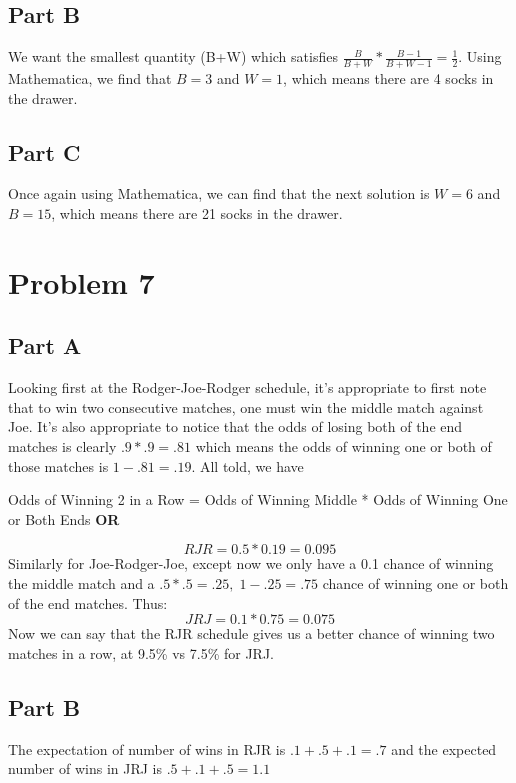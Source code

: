 \documentclass[11pt]{article}
\begin{document}
\subsection*{Part B}
We want the smallest quantity (B+W) which satisfies $\frac{B}{B+W} * \frac{B-1}{B+W-1} = \frac{1}{2}$. Using Mathematica, we find that $B = 3$ and $W = 1$, which means there are 4 socks in the drawer.

\subsection*{Part C}
Once again using Mathematica, we can find that the next solution is $W = 6$ and $B = 15$, which means there are 21 socks in the drawer.

\section*{Problem 7}
\subsection*{Part A}
Looking first at the Rodger-Joe-Rodger schedule, it's appropriate to first note that to win two consecutive matches, one must win the middle match against Joe. It's also appropriate to notice that the odds of losing both of the end matches is clearly $.9 * .9 = .81$ which means the odds of winning one or both of those matches is $1 - .81 = .19$. All told, we have
\begin{center}
Odds of Winning 2 in a Row = Odds of Winning Middle * Odds of Winning One or Both Ends
\textbf{OR}
\end{center}
\vspace{-2mm}
\[RJR = 0.5 * 0.19 = 0.095\]
Similarly for Joe-Rodger-Joe, except now we only have a 0.1 chance of winning the middle match and a $.5 * .5 = .25, \;1-.25 = .75$ chance of winning one or both of the end matches. Thus:
\[JRJ = 0.1 * 0.75 = 0.075\]
Now we can say that the RJR schedule gives us a better chance of winning two matches in a row, at 9.5\% vs 7.5\% for JRJ.

\subsection*{Part B}
The expectation of number of wins in RJR is $.1 + .5 + .1 = .7$ and the expected number of wins in JRJ is $.5 + .1 + .5 = 1.1$
\end{document}

